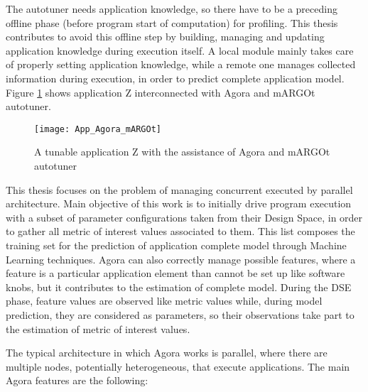 The autotuner needs application knowledge, so there have to be a preceding offline phase (before program start of computation) for profiling. This thesis contributes to avoid this offline step by building, managing and updating application knowledge during execution itself. A local module mainly takes care of properly setting application knowledge, while a remote one manages collected information during execution, in order to predict complete application model. Figure \ref{fig::appAGORA} shows application Z interconnected with Agora and mARGOt autotuner.

\begin{figure}[htb]

    \centering
    \texttt{[image: App\_Agora\_mARGOt]}
    \caption{A tunable application Z with the assistance of Agora and mARGOt autotuner}
    \label{fig::appAGORA}
    
\end{figure}

This thesis focuses on the problem of managing concurrent executed by parallel architecture. Main objective of this work is to initially drive program execution with a subset of parameter configurations taken from their Design Space, in order to gather all metric of interest values associated to them. This list composes the training set for the prediction of application complete model through Machine Learning techniques. Agora can also correctly manage possible features, where a feature is a particular application element than cannot be set up like software knobs, but it contributes to the estimation of complete model. During the DSE phase, feature values are observed like metric values while, during model prediction, they are considered as parameters, so their observations take part to the estimation of metric of interest values.

The typical architecture in which Agora works is parallel, where there are multiple nodes, potentially heterogeneous, that execute applications. The main Agora features are the following:

